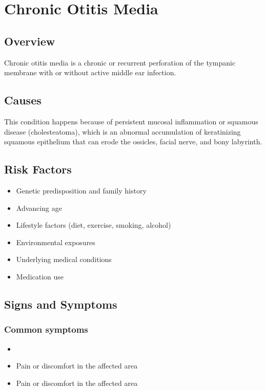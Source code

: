 \chapter{Chronic Otitis Media}
\label{sec:Chronic Otitis Media}

\section{Overview}
Chronic otitis media is a chronic or recurrent perforation of the tympanic membrane with or without active middle ear infection.
\section{Causes}
This condition happens because of persistent mucosal inflammation or squamous disease (cholesteatoma), which is an abnormal accumulation of keratinizing squamous epithelium that can erode the ossicles, facial nerve, and bony labyrinth.     
\section{Risk Factors}

\begin{itemize}[noitemsep]
  \item Genetic predisposition and family history
  \item Advancing age
  \item Lifestyle factors (diet, exercise, smoking, alcohol)
  \item Environmental exposures
  \item Underlying medical conditions
  \item Medication use
\end{itemize}
\section{Signs and Symptoms}

\subsection{Common symptoms}
\begin{itemize}[noitemsep]
  \item \item Pain or discomfort in the affected area    \item Pain or discomfort in the affected area
  \end{itemize}

